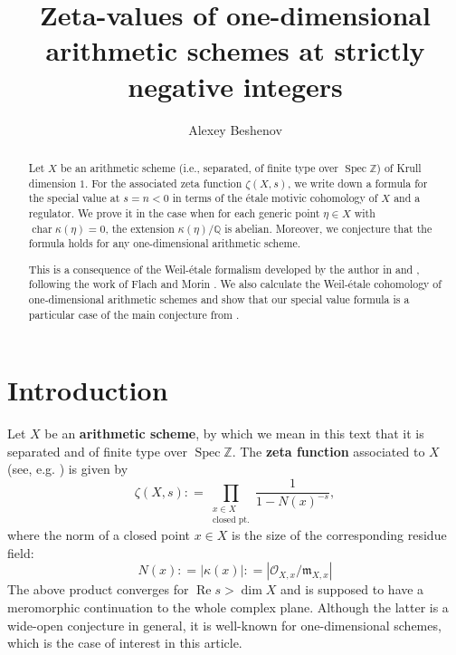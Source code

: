 \documentclass[draft]{article}
\title{Zeta-values of one-dimensional arithmetic schemes at strictly negative integers}
\author{Alexey Beshenov}
\DeclareMathOperator{\fchar}{char}
\DeclareMathOperator{\Spec}{Spec}
\newcommand{\QQ}{\mathbb{Q}}
\newcommand{\ZZ}{\mathbb{Z}}
\renewcommand{\Re}{\operatorname{Re}}
\newcommand{\dfn}{\mathrel{\mathop:}=}
\theoremstyle{myplain}
\theoremstyle{mydefinition}
\begin{document}
\maketitle

\begin{abstract}
  Let $X$ be an arithmetic scheme (i.e., separated, of finite type over
  $\Spec \ZZ$) of Krull dimension $1$. For the associated zeta function
  $\zeta (X,s)$, we write down a formula for the special value at $s = n < 0$ in
  terms of the \'{e}tale motivic cohomology of $X$ and a regulator. We prove it
  in the case when for each generic point $\eta \in X$ with
  $\fchar \kappa (\eta) = 0$, the extension $\kappa (\eta)/\QQ$ is
  abelian. Moreover, we conjecture that the formula holds for any
  one-dimensional arithmetic scheme.

  This is a consequence of the Weil-\'{e}tale formalism developed by the author
  in \cite{Beshenov-Weil-etale-1} and \cite{Beshenov-Weil-etale-2}, following
  the work of Flach and Morin \cite{Flach-Morin-2018}. We also calculate the
  Weil-\'{e}tale cohomology of one-dimensional arithmetic schemes and show that
  our special value formula is a particular case of the main conjecture from
  \cite{Beshenov-Weil-etale-2}.
\end{abstract}



\section{Introduction}

Let $X$ be an \textbf{arithmetic scheme}, by which we mean in this text that it
is separated and of finite type over $\Spec \ZZ$.  The \textbf{zeta function}
associated to $X$ (see, e.g. \cite{Serre-1965}) is given by
\[ \zeta (X,s) \dfn \prod_{\substack{x \in X \\ \text{closed pt.}}}
  \frac{1}{1 - N (x)^{-s}}, \]
where the norm of a closed point $x\in X$ is the size of the corresponding
residue field:
$$N (x) \dfn |\kappa (x)| \dfn |\mathcal{O}_{X,x}/\mathfrak{m}_{X,x}|$$
The above product converges for $\Re s > \dim X$ and is supposed to have a
meromorphic continuation to the whole complex plane. Although the latter is a
wide-open conjecture in general, it is well-known for one-dimensional schemes,
which is the case of interest in this article.
\end{document}
